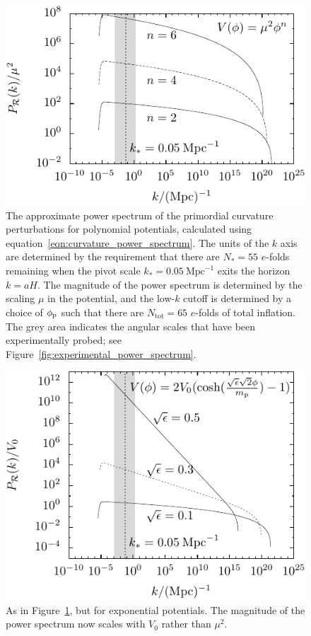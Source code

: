 %
\begin{figure}[tp]
  \includegraphics[width=\textwidth]{chapters/kinetic_dominance/figures/CSpol}
  \caption{The approximate power spectrum of the primordial curvature perturbations for polynomial potentials, calculated using equation~\protect\eqref{eqn:curvature_power_spectrum}. The units of the \(k\) axis are determined by the requirement that there are \(N_*=55\) \(e\)-folds remaining when the pivot scale \(k_*=0.05\:\mathrm{Mpc}^{-1}\) exits the horizon \(k=aH\). The magnitude of the power spectrum is determined by the scaling \(\mu\) in the potential, and the low-\(k\) cutoff is determined by a choice of \(\phi_{\mathrm{p}}\) such that there are \(N_\mathrm{tot}=65\) \(e\)-folds of total inflation. The grey area indicates the angular scales that have been experimentally probed; see Figure~\protect\ref{fig:experimental_power_spectrum}.}\label{fig:figure_CSpol}
\end{figure}
%

%
\begin{figure}[tp]
  \includegraphics[width=\textwidth]{chapters/kinetic_dominance/figures/CSlam}
  \caption{As in Figure~\protect\ref{fig:figure_CSpol}, but for exponential potentials. The magnitude of the power spectrum now scales with \(V_0\) rather than \(\mu^2\).}\label{fig:figure_CSlam}
\end{figure}
%



